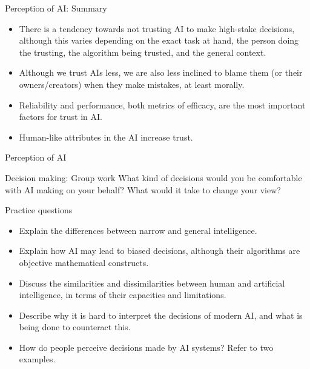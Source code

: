 \documentclass[8pt]{beamer}
\begin{document}
	\begin{frame}{Perception of AI: Summary}
		\begin{itemize}
			\item There is a tendency towards not trusting AI to make high-stake decisions, although this varies depending on the exact task at hand, the person doing the trusting, the algorithm being trusted, and the general context.
			\item Although we trust AIs less, we are also less inclined to blame them (or their owners/creators) when they make mistakes, at least morally.
			\item Reliability and performance, both metrics of efficacy, are the most important factors for trust in AI.
			\item Human-like attributes in the AI increase trust.
		\end{itemize}
	\end{frame}

	\begin{frame}{Perception of AI}
		\centering
	\end{frame}

	\begin{frame}{Decision making: Group work}
		What kind of decisions would you be comfortable with AI making on your behalf? What would it take to change your view?
	\end{frame}

	\begin{frame}{Practice questions}
		\begin{itemize}
			\item Explain the differences between narrow and general intelligence.
			\item Explain how AI may lead to biased decisions, although their algorithms are objective mathematical constructs.
			\item Discuss the similarities and dissimilarities between human and artificial intelligence, in terms of their capacities and limitations.
			\item Describe why it is hard to interpret the decisions of modern AI, and what is being done to counteract this.
			\item How do people perceive decisions made by AI systems? Refer to two examples.
		\end{itemize}
	\end{frame}
\end{document}
